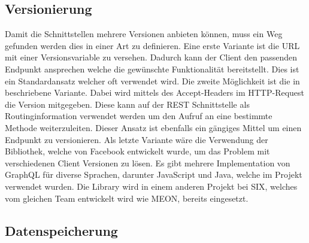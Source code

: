 \subsection{Versionierung}

Damit die Schnittstellen mehrere Versionen anbieten können, muss ein Weg gefunden werden dies in einer Art zu definieren. Eine erste Variante ist die URL mit einer Versionsvariable zu versehen. Dadurch kann der Client den passenden Endpunkt ansprechen welche die gewünschte Funktionalität bereitstellt. Dies ist ein Standardansatz welcher oft verwendet wird. Die zweite Möglichkeit ist die in \cite{contneg} beschriebene Variante. Dabei wird mittels des Accept-Headers im HTTP-Request die Version mitgegeben. Diese kann auf der REST Schnittstelle als Routinginformation verwendet werden um den Aufruf an eine bestimmte Methode weiterzuleiten. Dieser Ansatz ist ebenfalls ein gängiges Mittel um einen Endpunkt zu versionieren. Als letzte Variante wäre die Verwendung der \cite{gq} Bibliothek, welche von Facebook entwickelt wurde, um das Problem mit verschiedenen Client Versionen zu lösen. Es gibt mehrere Implementation von GraphQL für diverse Sprachen, darunter JavaScript und Java, welche im Projekt verwendet wurden. Die Library wird in einem anderen Projekt bei SIX, welches vom gleichen Team entwickelt wird wie MEON, bereits eingesetzt.

\subsection{Datenspeicherung}

